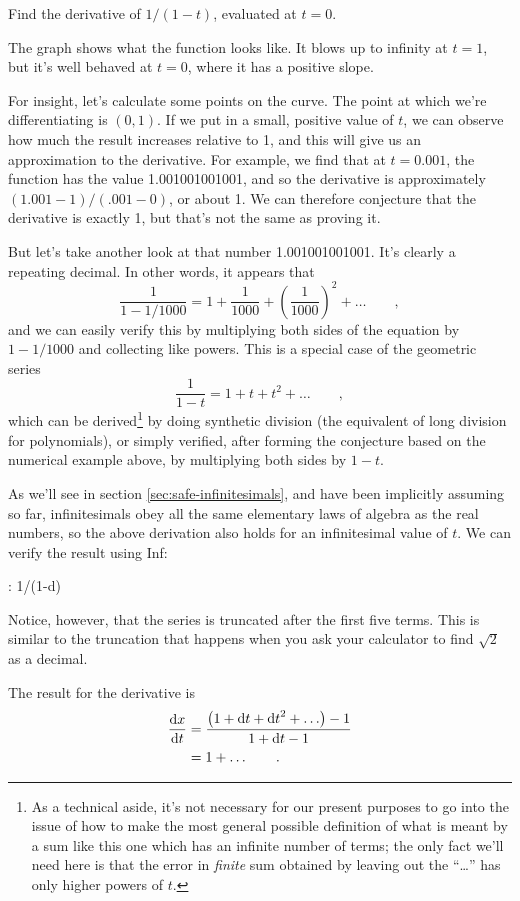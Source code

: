 \begin{eg}\label{eg:geometric-series}
\egquestion
Find the derivative of $1/(1-t)$, evaluated at $t=0$.

\eganswer
The graph shows what the function looks like. It blows up to infinity at $t=1$, but it's well behaved at $t=0$, where it has a
positive slope.

For insight, let's calculate some points on the curve. The point at which we're differentiating is
$(0,1)$. If we put in a small, positive value of $t$, we can observe how much the result increases
relative to 1, and this will give us an approximation to the derivative. For example, we find
that at $t=0.001$, the function has the value 1.001001001001, and so the derivative
is approximately $(1.001-1)/(.001-0)$, or about 1. We can therefore conjecture that the derivative
is exactly 1, but that's not the same as proving it.

But let's take another look at that number 1.001001001001. It's clearly a repeating decimal.
In other words, it appears that
\begin{equation*}
       \frac{1}{1-1/1000} = 1+\frac{1}{1000}+\left(\frac{1}{1000}\right)^2+\ldots \qquad ,
\end{equation*}
and we can easily verify this by multiplying both sides of the equation by $1-1/1000$ and collecting like
powers. This is a special case of the geometric series\label{geometric-series}
\begin{equation*}
       \frac{1}{1-t} = 1+t+t^2+\ldots \qquad ,
\end{equation*}
which can be derived\footnote{As a technical aside, it's not necessary for our present purposes
to go into the issue of how to make the most general possible definition of what is meant by
a sum like this one which has an infinite number of terms; the only fact we'll need here is that
the error in \emph{finite} sum obtained by leaving out the ``\ldots'' has only higher powers of $t$.}
by doing synthetic division (the equivalent of long
division for polynomials), or simply verified, after forming the conjecture based on the numerical
example above, by multiplying both sides by $1-t$.

As we'll see in section \ref{sec:safe-infinitesimals}, and have been implicitly assuming so far,
infinitesimals obey all the same elementary laws of algebra as the real numbers,
so the above derivation also holds for an infinitesimal value of $t$.
We can verify the result using Inf:
\begin{Code}
  \ii : 1/(1-d)
\end{Code}
Notice, however, that the series is truncated after the first five terms. This is similar to
the truncation that happens when you ask your calculator to find $\sqrt{2}$ as a decimal.

The result for the derivative is
\begin{align*}
  \frac{\textup{d} x}{\textup{d} t} &= \frac{\left(1+\textup{d} t+{\textup{d} t}^2+\ldots\right)-1}{1+\textup{d} t-1} \\
                        &= 1+\ldots \qquad .
\end{align*}
\end{eg}


